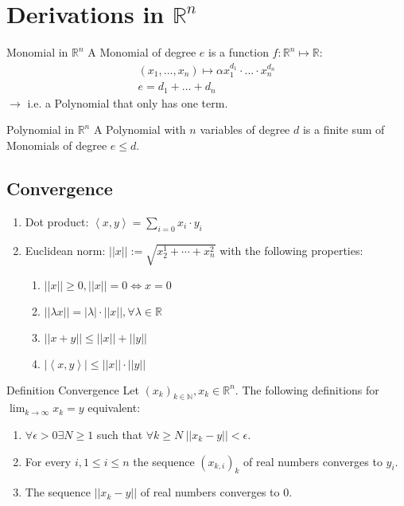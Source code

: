 \documentclass[a4paper,fontsize = 10pt]{article}
\def\R{\mathbb{R}}
\begin{document}
\section{Derivations in \texorpdfstring{\(\R^n\)}{Rⁿ}}
\begin{subbox}{Monomial in $\R^n$}
  A Monomial of degree \(e\) is a function $f: \R^n \mapsto \R:$
  \begin{align*}
    (x_1, \ldots, x_n) \mapsto \alpha x_1^{d_1}\cdot \ldots \cdot x_n^{d_n} \\
    e = d_1 + \ldots + d_n 
  \end{align*}
  \(\to\) i.e. a Polynomial that only has one term.
\end{subbox}
\begin{mainbox}{Polynomial in $\R^n$}
  A Polynomial with \(n\) variables of degree \(d\) is a finite sum of Monomials of degree \(e \le d\).
\end{mainbox}

\subsection{Convergence}
\begin{enumerate}
  \item Dot product: \(\left< x,y\right> = \sum_{i=0} x_i \cdot y_i\)
  \item Euclidean norm: \(||x|| := \sqrt{x_2^1 + \cdots + x_n^2}\) with the following properties:
  \begin{enumerate}
    \item \(||x|| \ge 0, ||x|| = 0 \iff x = 0\)
    \item \(||\lambda x|| = |\lambda| \cdot ||x||, \forall \lambda \in \R\)
    \item \(||x+y|| \le ||x|| + ||y||\)
    \item \(|\left<x,y\right>| \le ||x|| \cdot ||y||\)
  \end{enumerate}
\end{enumerate}

\begin{mainbox}{Definition Convergence}
  Let \((x_k)_{k \in \mathbb{N}}, x_k \in \R^n\). The following definitions for \(\lim_{k\to\infty}x_k = y\) equivalent:
  \begin{enumerate}
    \item \(\forall \epsilon > 0 \exists N \ge 1\) such that \(\forall k \ge N \ ||x_k - y|| < \epsilon\).
    \item For every \(i, 1 \le i \le n\) the sequence \((x_{k,i})_k\) of real numbers converges to \(y_i\).
    \item The sequence \(||x_k - y||\) of real numbers converges to \(0\).
  \end{enumerate}
\end{mainbox}
\end{document}

